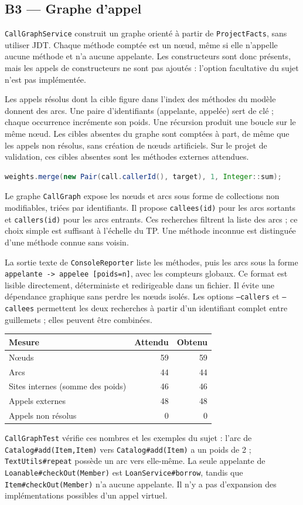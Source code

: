 \documentclass[11pt,a4paper]{article}
\newcommand{\code}[1]{\texttt{#1}}
\begin{document}
\subsection{B3 --- Graphe d'appel}
\code{CallGraphService} construit un graphe orienté à partir de \code{ProjectFacts}, sans utiliser JDT. Chaque méthode comptée est un nœud, même si elle n'appelle aucune méthode et n'a aucune appelante. Les constructeurs sont donc présents, mais les appels de constructeurs ne sont pas ajoutés : l'option facultative du sujet n'est pas implémentée.

Les appels résolus dont la cible figure dans l'index des méthodes du modèle donnent des arcs. Une paire d'identifiants (appelante, appelée) sert de clé ; chaque occurrence incrémente son poids. Une récursion produit une boucle sur le même nœud. Les cibles absentes du graphe sont comptées à part, de même que les appels non résolus, sans création de nœuds artificiels. Sur le projet de validation, ces cibles absentes sont les méthodes externes attendues.
\begin{lstlisting}[language=Java]
weights.merge(new Pair(call.callerId(), target), 1, Integer::sum);
\end{lstlisting}
Le graphe \code{CallGraph} expose les nœuds et arcs sous forme de collections non modifiables, triées par identifiants. Il propose \code{callees(id)} pour les arcs sortants et \code{callers(id)} pour les arcs entrants. Ces recherches filtrent la liste des arcs ; ce choix simple est suffisant à l'échelle du TP. Une méthode inconnue est distinguée d'une méthode connue sans voisin.

La sortie texte de \code{ConsoleReporter} liste les méthodes, puis les arcs sous la forme \code{appelante -> appelee [poids=n]}, avec les compteurs globaux. Ce format est lisible directement, déterministe et redirigeable dans un fichier. Il évite une dépendance graphique sans perdre les nœuds isolés. Les options \code{--callers} et \code{--callees} permettent les deux recherches à partir d'un identifiant complet entre guillemets ; elles peuvent être combinées.

\begin{center}
\begin{tabular}{lrr}
\toprule
Mesure & Attendu & Obtenu\\
\midrule
Nœuds & 59 & 59\\
Arcs & 44 & 44\\
Sites internes (somme des poids) & 46 & 46\\
Appels externes & 48 & 48\\
Appels non résolus & 0 & 0\\
\bottomrule
\end{tabular}
\end{center}
\code{CallGraphTest} vérifie ces nombres et les exemples du sujet : l'arc de \code{Catalog\#add(Item,Item)} vers \code{Catalog\#add(Item)} a un poids de 2 ; \code{TextUtils\#repeat} possède un arc vers elle-même. La seule appelante de \code{Loanable\#checkOut(Member)} est \code{LoanService\#borrow}, tandis que \code{Item\#checkOut(Member)} n'a aucune appelante. Il n'y a pas d'expansion des implémentations possibles d'un appel virtuel.
\end{document}
